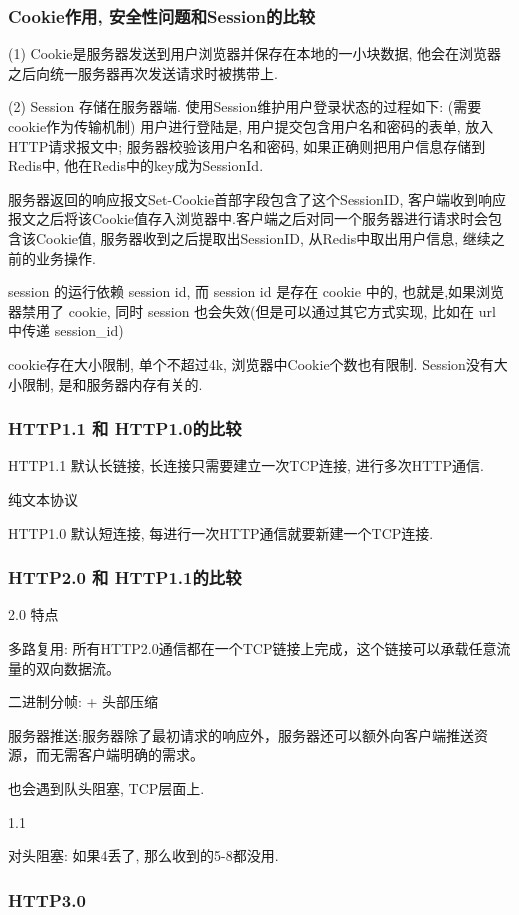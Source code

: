 \documentclass[UTF8]{ctexart}
\begin{document}
\subsubsection{Cookie作用, 安全性问题和Session的比较}
(1) Cookie是服务器发送到用户浏览器并保存在本地的一小块数据,  他会在浏览器之后向统一服务器再次发送请求时被携带上.
\par
(2) Session 存储在服务器端. 使用Session维护用户登录状态的过程如下: (需要cookie作为传输机制)
用户进行登陆是, 用户提交包含用户名和密码的表单, 放入HTTP请求报文中;
服务器校验该用户名和密码, 如果正确则把用户信息存储到Redis中, 他在Redis中的key成为SessionId.
\par
服务器返回的响应报文Set-Cookie首部字段包含了这个SessionID, 客户端收到响应报文之后将该Cookie值存入浏览器中.客户端之后对同一个服务器进行请求时会包含该Cookie值, 服务器收到之后提取出SessionID, 从Redis中取出用户信息, 继续之前的业务操作.
\par
session 的运行依赖 session id, 而 session id 是存在 cookie 中的, 也就是,如果浏览器禁用了 cookie, 同时 session 也会失效(但是可以通过其它方式实现, 比如在 url 中传递 session\_id)
\par
cookie存在大小限制, 单个不超过4k, 浏览器中Cookie个数也有限制.
Session没有大小限制, 是和服务器内存有关的.
\subsubsection{HTTP1.1 和 HTTP1.0的比较}
HTTP1.1 默认长链接, 长连接只需要建立一次TCP连接, 进行多次HTTP通信. 

纯文本协议


HTTP1.0 默认短连接, 每进行一次HTTP通信就要新建一个TCP连接.
\subsubsection{HTTP2.0 和 HTTP1.1的比较}
2.0 特点

多路复用: 所有HTTP2.0通信都在一个TCP链接上完成，这个链接可以承载任意流量的双向数据流。

二进制分帧: + 头部压缩

服务器推送:服务器除了最初请求的响应外，服务器还可以额外向客户端推送资源，而无需客户端明确的需求。

也会遇到队头阻塞, TCP层面上. 

1.1 

对头阻塞: 如果4丢了, 那么收到的5-8都没用.

\subsubsection{HTTP3.0}
\end{document}
